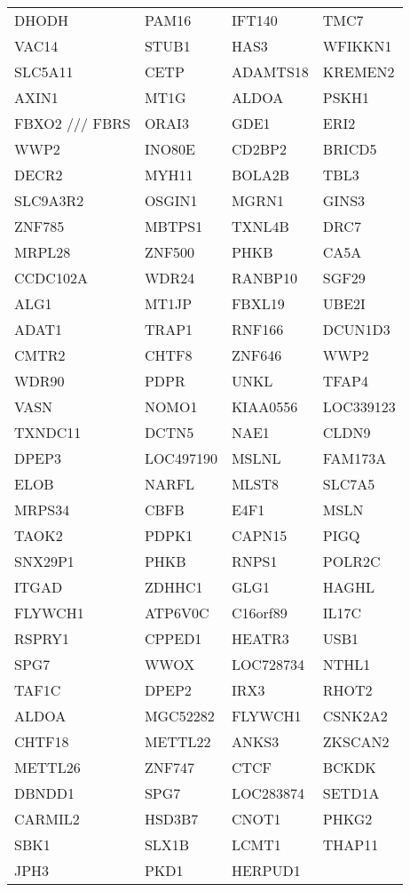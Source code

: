 {\begin{longtable}{llll}
\newpage
DHODH&PAM16&IFT140&TMC7\tabularnewline
VAC14&STUB1&HAS3&WFIKKN1\tabularnewline
SLC5A11&CETP&ADAMTS18&KREMEN2\tabularnewline
AXIN1&MT1G&ALDOA&PSKH1\tabularnewline
FBXO2 /// FBRS&ORAI3&GDE1&ERI2\tabularnewline
WWP2&INO80E&CD2BP2&BRICD5\tabularnewline
DECR2&MYH11&BOLA2B&TBL3\tabularnewline
SLC9A3R2&OSGIN1&MGRN1&GINS3\tabularnewline
ZNF785&MBTPS1&TXNL4B&DRC7\tabularnewline
MRPL28&ZNF500&PHKB&CA5A\tabularnewline
CCDC102A&WDR24&RANBP10&SGF29\tabularnewline
ALG1&MT1JP&FBXL19&UBE2I\tabularnewline
ADAT1&TRAP1&RNF166&DCUN1D3\tabularnewline
CMTR2&CHTF8&ZNF646&WWP2\tabularnewline
WDR90&PDPR&UNKL&TFAP4\tabularnewline
VASN&NOMO1&KIAA0556&LOC339123\tabularnewline
TXNDC11&DCTN5&NAE1&CLDN9\tabularnewline
DPEP3&LOC497190&MSLNL&FAM173A\tabularnewline
ELOB&NARFL&MLST8&SLC7A5\tabularnewline
MRPS34&CBFB&E4F1&MSLN\tabularnewline
TAOK2&PDPK1&CAPN15&PIGQ\tabularnewline
SNX29P1&PHKB&RNPS1&POLR2C\tabularnewline
ITGAD&ZDHHC1&GLG1&HAGHL\tabularnewline
FLYWCH1&ATP6V0C&C16orf89&IL17C\tabularnewline
RSPRY1&CPPED1&HEATR3&USB1\tabularnewline
SPG7&WWOX&LOC728734&NTHL1\tabularnewline
TAF1C&DPEP2&IRX3&RHOT2\tabularnewline
ALDOA&MGC52282&FLYWCH1&CSNK2A2\tabularnewline
CHTF18&METTL22&ANKS3&ZKSCAN2\tabularnewline
METTL26&ZNF747&CTCF&BCKDK\tabularnewline
DBNDD1&SPG7&LOC283874&SETD1A\tabularnewline
CARMIL2&HSD3B7&CNOT1&PHKG2\tabularnewline
SBK1&SLX1B&LCMT1&THAP11\tabularnewline
JPH3&PKD1&HERPUD1&\tabularnewline
\bottomrule
\end{longtable}}
\addtocounter{table}{-1}
